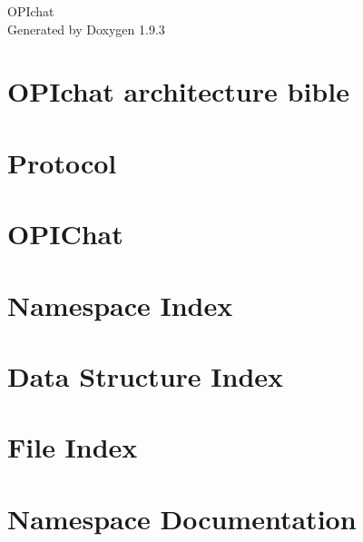 \documentclass[twoside]{book}
\newcommand{\+}{\discretionary{\mbox{\scriptsize$\hookleftarrow$}}{}{}}
\newcommand{\clearemptydoublepage}{%
    \newpage{\pagestyle{empty}\cleardoublepage}%
  }
\begin{document}
  \raggedbottom
    \hypersetup{pageanchor=false,
                bookmarksnumbered=true,
                pdfencoding=unicode
               }
  \begin{titlepage}
  \vspace*{7cm}
  \begin{center}%
  {\Large OPIchat}\\
  \vspace*{1cm}
  {\large Generated by Doxygen 1.9.3}\\
  \end{center}
  \end{titlepage}
  \clearemptydoublepage
  \tableofcontents
  \clearemptydoublepage
  \hypersetup{pageanchor=true}
\chapter{OPIchat architecture bible}
\label{md__a_r_c_h}

\chapter{Protocol}
\label{md__p_r_o_t_o_c_o_l}

\chapter{OPIChat}
\label{md__r_e_a_d_m_e}

\chapter{Namespace Index}

\chapter{Data Structure Index}

\chapter{File Index}

\chapter{Namespace Documentation}

\end{document}
